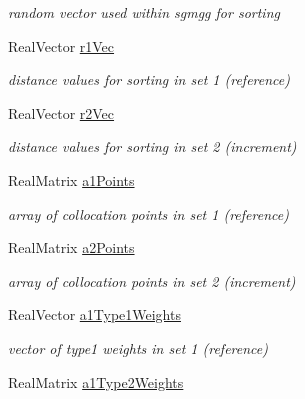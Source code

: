 \begin{DoxyCompactItemize}
\begin{DoxyCompactList}\small\item\em random vector used within sgmgg for sorting \end{DoxyCompactList}\item 
Real\+Vector \hyperlink{classPecos_1_1CombinedSparseGridDriver_a4924cc208fff080746a7538a022a10be}{r1\+Vec}\label{classPecos_1_1CombinedSparseGridDriver_a4924cc208fff080746a7538a022a10be}

\begin{DoxyCompactList}\small\item\em distance values for sorting in set 1 (reference) \end{DoxyCompactList}\item 
Real\+Vector \hyperlink{classPecos_1_1CombinedSparseGridDriver_a5d12fe02987f9013890917c00416f346}{r2\+Vec}\label{classPecos_1_1CombinedSparseGridDriver_a5d12fe02987f9013890917c00416f346}

\begin{DoxyCompactList}\small\item\em distance values for sorting in set 2 (increment) \end{DoxyCompactList}\item 
Real\+Matrix \hyperlink{classPecos_1_1CombinedSparseGridDriver_a1b34c4c587d4fa71d9a787818fd1b096}{a1\+Points}\label{classPecos_1_1CombinedSparseGridDriver_a1b34c4c587d4fa71d9a787818fd1b096}

\begin{DoxyCompactList}\small\item\em array of collocation points in set 1 (reference) \end{DoxyCompactList}\item 
Real\+Matrix \hyperlink{classPecos_1_1CombinedSparseGridDriver_a00776b02c47d3167bfc4f40df848d843}{a2\+Points}\label{classPecos_1_1CombinedSparseGridDriver_a00776b02c47d3167bfc4f40df848d843}

\begin{DoxyCompactList}\small\item\em array of collocation points in set 2 (increment) \end{DoxyCompactList}\item 
Real\+Vector \hyperlink{classPecos_1_1CombinedSparseGridDriver_ad85e729deb4c8a70b933eb53e3804d64}{a1\+Type1\+Weights}\label{classPecos_1_1CombinedSparseGridDriver_ad85e729deb4c8a70b933eb53e3804d64}

\begin{DoxyCompactList}\small\item\em vector of type1 weights in set 1 (reference) \end{DoxyCompactList}\item 
Real\+Matrix \hyperlink{classPecos_1_1CombinedSparseGridDriver_a28281e426ece80571949cd724e291315}{a1\+Type2\+Weights}\label{classPecos_1_1CombinedSparseGridDriver_a28281e426ece80571949cd724e291315}


\end{DoxyCompactItemize}
